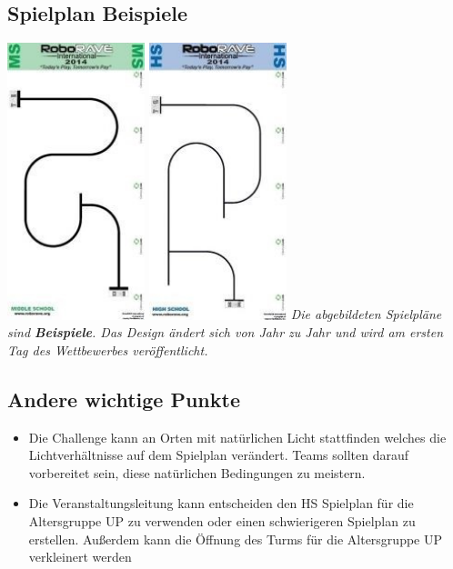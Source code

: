 \documentclass[a4paper,12pt]{article}
\begin{document}
\subsection{Spielplan Beispiele}
\includegraphics[width=0.3\textwidth]{images/track_ms_lf.png}
\includegraphics[width=0.3\textwidth]{images/track_hs_lf.png}
\emph{Die abgebildeten Spielpläne sind \textbf{Beispiele}. Das Design ändert sich von Jahr zu
Jahr und wird am ersten Tag des Wettbewerbes veröffentlicht.}
\subsection{Andere wichtige Punkte }
\begin{itemize}
	\item Die Challenge kann an Orten mit natürlichen Licht stattfinden
		welches die Lichtverhältnisse auf dem Spielplan verändert.
		Teams sollten darauf vorbereitet sein, diese natürlichen
		Bedingungen zu meistern.
	\item Die Veranstaltungsleitung kann entscheiden den HS Spielplan für
		die Altersgruppe UP zu verwenden oder einen schwierigeren
		Spielplan zu erstellen. Außerdem kann die Öffnung des Turms für
		die Altersgruppe UP verkleinert werden
\end{itemize}
\end{document}
